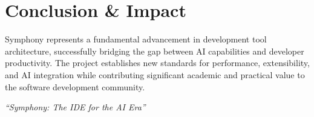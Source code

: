\section*{Conclusion \& Impact}

Symphony represents a fundamental advancement in development tool architecture, successfully bridging the gap between AI capabilities and developer productivity. The project establishes new standards for performance, extensibility, and AI integration while contributing significant academic and practical value to the software development community.

\begin{center}
\textit{``Symphony: The IDE for the AI Era''}
\end{center}

\clearpage
